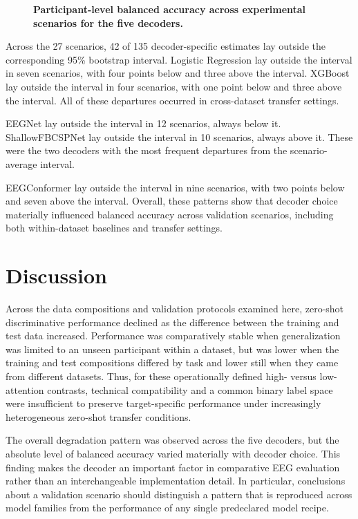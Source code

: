 \documentclass[10pt,letterpaper]{article}
\begin{document}
\begin{figure}[H]
\centering
\caption{\textbf{Participant-level balanced accuracy across experimental scenarios for the five decoders.}}
\label{fig:scenario_accuracy_by_decoder}
\end{figure}

Across the 27 scenarios, 42 of 135 decoder-specific estimates lay outside the
corresponding 95\% bootstrap interval. Logistic Regression lay outside the
interval in seven scenarios, with four points below and three above the
interval. XGBoost lay outside the interval in four scenarios, with one point
below and three above the interval. All of these departures occurred in
cross-dataset transfer settings.

EEGNet lay outside the interval in 12 scenarios, always below it.
ShallowFBCSPNet lay outside the interval in 10 scenarios, always above it.
These were the two decoders with the most frequent departures from the
scenario-average interval.

EEGConformer lay outside the interval in nine scenarios, with two points below
and seven above the interval. Overall, these patterns show that decoder choice
materially influenced balanced accuracy across validation scenarios, including
both within-dataset baselines and transfer settings.

\section*{Discussion}

Across the data compositions and validation protocols examined here, zero-shot
discriminative performance declined as the difference between the training and
test data increased. Performance was comparatively stable when generalization
was limited to an unseen participant within a dataset, but was lower when the
training and test compositions differed by task and lower still when they came
from different datasets. Thus, for these operationally defined high- versus
low-attention contrasts, technical compatibility and a common binary label space
were insufficient to preserve target-specific performance under increasingly
heterogeneous zero-shot transfer conditions.

\medskip

The overall degradation pattern was observed across the five decoders, but the
absolute level of balanced accuracy varied materially with decoder choice.
This finding makes the decoder an important factor in comparative EEG
evaluation rather than an interchangeable implementation detail. In
particular, conclusions about a validation scenario should distinguish a
pattern that is reproduced across model families from the performance of any
single predeclared model recipe.
\end{document}
